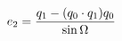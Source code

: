 \documentclass[preview]{standalone}
\begin{document}
\begin{align*}
\special{dvisvgm:raw <g id='unique000'>}e_2=\frac{q_1-(q_0\cdot q_1)q_0}{\sin\Omega}\special{dvisvgm:raw </g>}
\end{align*}
\end{document}
